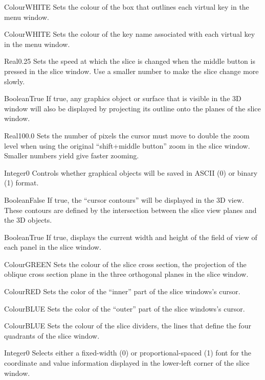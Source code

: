 {Colour}{WHITE}
{Sets the colour of the box that outlines each virtual key in the menu window.}{}

{Colour}{WHITE}
{Sets the colour of the key name associated with each virtual key in the menu window.}{}

{Real}{0.25}
{Sets the speed at which the slice is changed when the middle button is pressed in the slice window. Use a smaller number to make the slice change more slowly.}{}

{Boolean}{True}
{If true, any graphics object or surface that is visible in the 3D window will also be displayed by projecting its outline onto the planes of the slice window.}{}

{Real}{100.0}
{Sets the number of pixels the cursor must move to double the zoom level when using the original ``shift+middle button'' zoom in the slice window. Smaller numbers yield give faster zooming.}{}

{Integer}{0}
{Controls whether graphical objects will be saved in ASCII (0) or binary (1) format.}{}

{Boolean}{False}
{If true, the ``cursor contours'' will be displayed in the 3D
  view. These contours are defined by the intersection between the slice
  view planes and the 3D objects.}{}

{Boolean}{True}
{If true, displays the current width and height of the field of view of each panel in the slice window.}{}

{Colour}{GREEN}
{Sets the colour of the slice cross section, the projection of the oblique cross section plane in the three orthogonal planes in the slice window.}{}

{Colour}{RED}
{Sets the color of the ``inner'' part of the slice windows's cursor.}{}

{Colour}{BLUE}
{Sets the color of the ``outer'' part of the slice windows's cursor.}{}

{Colour}{BLUE}
{Sets the colour of the slice dividers, the lines that define the four quadrants of the slice window.}{}

{Integer}{0}
{Selects either a fixed-width (0) or proportional-spaced (1) font for the
coordinate and value information displayed in the lower-left corner of the slice window.}{}

